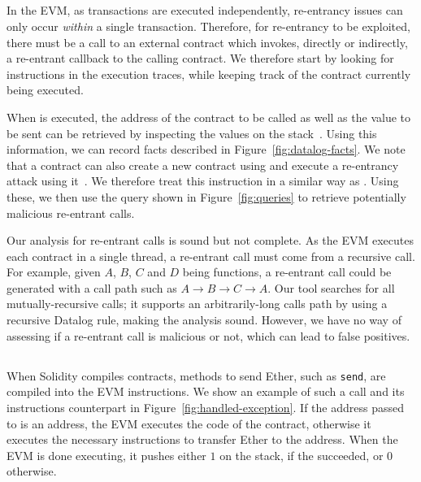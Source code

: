 


\subsection{\reentrancy}
In the EVM, as transactions are executed independently, re-entrancy issues can only occur \emph{within} a single transaction. Therefore, for re-entrancy to be exploited, there must be a call to an external contract which invokes, directly or indirectly, a re-entrant callback to the calling contract. We therefore start by looking for  instructions in the execution traces, while keeping track of the contract currently being executed.

When  is executed, the address of the contract to be called as well as the value to be sent can be retrieved by inspecting the values on the stack~\cite{wood2014ethereum}. Using this information, we can record  facts described in Figure~\ref{fig:datalog-facts}.
We note that a contract can also create a new contract using  and execute a re-entrancy attack using it~\cite{Rodler2019}. We therefore treat this instruction in a similar way as .
Using these, we then use the query shown in Figure~\ref{fig:queries} to retrieve potentially malicious re-entrant calls.

\correctness Our analysis for re-entrant calls is sound but not complete. As the EVM executes each contract in a single thread, a re-entrant call must come from a recursive call. For example, given $A$, $B$, $C$ and $D$ being functions, a re-entrant call could be generated with a call path such as $A\rightarrow B \rightarrow C\rightarrow A$. Our tool searches for all mutually-recursive calls; it supports an arbitrarily-long calls path by using a recursive Datalog rule, making the analysis sound. However, we have no way of assessing if a re-entrant call is malicious or not, which can lead to false positives.

\subsection{\unhandledexceptions}
%
When Solidity compiles contracts, methods to send Ether, such as \lstinline{send}, are compiled into the EVM  instructions. We show an example of such a call and its instructions counterpart in Figure~\ref{fig:handled-exception}. If the address passed to  is an address, the EVM executes the code of the contract, otherwise it executes the necessary instructions to transfer Ether to the address. When the EVM is done executing, it pushes either $1$ on the stack, if the  succeeded, or $0$ otherwise. 

